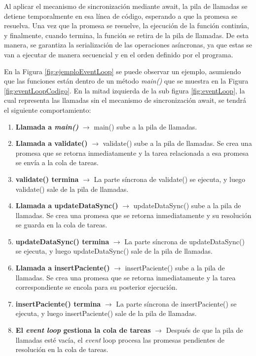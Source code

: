 Al aplicar el mecanismo de sincronización mediante await, la pila de llamadas se detiene temporalmente en esa línea de código, esperando a que la promesa se resuelva. Una vez que la promesa se resuelve, la ejecución de la función continúa, y finalmente, cuando termina, la función se retira de la pila de llamadas. De esta manera, se garantiza la serialización de las operaciones asíncronas, ya que estas se van a ejecutar de manera secuencial y en el orden definido por el programa.

En la Figura \ref{fig:ejemploEventLoop} se puede observar un ejemplo, asumiendo que las funciones están dentro de un método \textit{main()} que se muestra en la Figura \ref{fig:eventLoopCodigo}. En la mitad izquierda de la sub figura \ref{fig:eventLoop}, la cual representa las llamadas sin el mecanismo de sincronización await, se tendrá el siguiente comportamiento:

\begin{enumerate} 
    \item \textbf{Llamada a \textit{main()}} $\rightarrow$ main() sube a la pila de llamadas.
    
    \item \textbf{Llamada a validate()} $\rightarrow$ validate() sube a la pila de llamadas. Se crea una promesa que se retorna inmediatamente y la tarea relacionada a esa promesa se envía a la cola de tareas. 
    
    \item \textbf{validate() termina} $\rightarrow$ La parte síncrona de validate() se ejecuta, y luego validate() sale de la pila de llamadas. 
    
    \item \textbf{Llamada a updateDataSync()} $\rightarrow$ updateDataSync() sube a la pila de llamadas. Se crea una promesa que se retorna inmediatamente y su resolución se guarda en la cola de tareas. 
    
    \item \textbf{updateDataSync() termina} $\rightarrow$ La parte síncrona de updateDataSync() se ejecuta, y luego updateDataSync() sale de la pila de llamadas. 
    
    \item \textbf{Llamada a insertPaciente()} $\rightarrow$ insertPaciente() sube a la pila de llamadas. Se crea una promesa que se retorna inmediatamente y la tarea correspondiente se encola para su posterior ejecución.

 \item \textbf{insertPaciente() termina} $\rightarrow$ La parte síncrona de insertPaciente() se ejecuta, y luego insertPaciente() sale de la pila de llamadas. 
    
    \item \textbf{El \textit{event loop} gestiona la cola de tareas} $\rightarrow$ Después de que la pila de llamadas esté vacía, el \textit{event} loop procesa las promesas pendientes de resolución en la cola de tareas. 
\end{enumerate}

